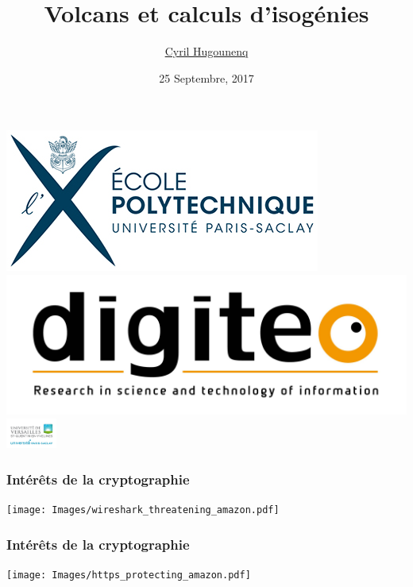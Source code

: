 \documentclass[10pt,a4paper]{beamer}
\theoremstyle{plain}
\theoremstyle{definition}
\theoremstyle{definition}
\theoremstyle{definition}
\theoremstyle{definition}
\theoremstyle{remark}
\theoremstyle{remark}
\theoremstyle{definition}
\begin{document}
\author{
\href{http://www.prism.uvsq.fr/~huc/}{Cyril Hugounenq}
}
\title[Volcans et calculs d'isogénies]{
Volcans et calculs d'isogénies}
\date{25 Septembre, 2017}


\begin{frame}
\titlepage

\hfill
\includegraphics[scale=0.6]{Images/Logo_Ecole_polytechnique_horizontal_300dpi.jpg} \hfill
\includegraphics[scale=0.1]{Images/digiteo.jpg}\hfill
\includegraphics[height=10mm]{Images/uvsq-logo-cmjn.jpg}
\end{frame}

\begin{frame}
\frametitle{Intérêts de la cryptographie}
\texttt{[image: Images/wireshark\_threatening\_amazon.pdf]} 
\end{frame}

\begin{frame}
\frametitle{Intérêts de la cryptographie}
\texttt{[image: Images/https\_protecting\_amazon.pdf]} 
\end{frame}
\end{document}
